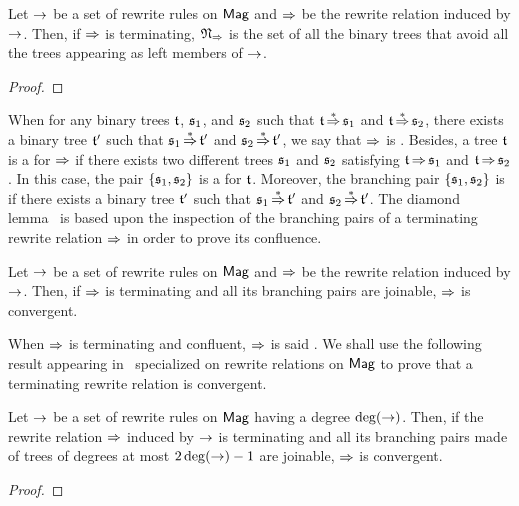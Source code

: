 \begin{Lemma} \label{lem:normal_forms_avoiding}
    Let $\operatorname{\to}$ be a set of rewrite rules on $\mathsf{Mag}$ and $\operatorname{\Rightarrow}$ be
    the rewrite relation induced by $\operatorname{\to}$. Then, if $\operatorname{\Rightarrow}$ is
    terminating, $\mathfrak{N}_{\operatorname{\Rightarrow}}$ is the set of all the
    binary trees that avoid all the trees appearing as left members
    of $\operatorname{\to}$.
\end{Lemma}
\begin{proof}
\end{proof}
\medbreak

When for any binary trees $\mathfrak{t}$, $\mathfrak{s}_1$, and $\mathfrak{s}_2$ such that
$\mathfrak{t} \operatorname{\overset{\ast}{\operatorname{\Rightarrow}}} \mathfrak{s}_1$ and $\mathfrak{t} \operatorname{\overset{\ast}{\operatorname{\Rightarrow}}} \mathfrak{s}_2$, there
exists a binary tree $\mathfrak{t}'$ such that $\mathfrak{s}_1 \operatorname{\overset{\ast}{\operatorname{\Rightarrow}}} \mathfrak{t}'$ and
$\mathfrak{s}_2 \operatorname{\overset{\ast}{\operatorname{\Rightarrow}}} \mathfrak{t}'$, we say that $\operatorname{\Rightarrow}$ is
. Besides, a tree $\mathfrak{t}$ is a  for
$\operatorname{\Rightarrow}$ if there exists two different trees $\mathfrak{s}_1$ and $\mathfrak{s}_2$
satisfying $\mathfrak{t} \operatorname{\Rightarrow} \mathfrak{s}_1$ and $\mathfrak{t} \operatorname{\Rightarrow} \mathfrak{s}_2$. In
this case, the pair $\{\mathfrak{s}_1, \mathfrak{s}_2\}$ is a  for
$\mathfrak{t}$. Moreover, the branching pair $\{\mathfrak{s}_1, \mathfrak{s}_2\}$ is
 if there exists a binary tree $\mathfrak{t}'$ such that
$\mathfrak{s}_1 \operatorname{\overset{\ast}{\operatorname{\Rightarrow}}} \mathfrak{t}'$ and $\mathfrak{s}_2 \operatorname{\overset{\ast}{\operatorname{\Rightarrow}}} \mathfrak{t}'$. The
diamond lemma~\cite{New42} is based upon the inspection of the branching
pairs of a terminating rewrite relation $\operatorname{\Rightarrow}$ in order to prove
its confluence.
\medbreak

\begin{Lemma} \label{lem:diamond_lemma}
    Let $\operatorname{\to}$ be a set of rewrite rules on $\mathsf{Mag}$ and $\operatorname{\Rightarrow}$ be
    the rewrite relation induced by $\operatorname{\to}$. Then, if $\operatorname{\Rightarrow}$ is
    terminating and all its branching pairs are joinable, $\operatorname{\Rightarrow}$
    is convergent.
\end{Lemma}
\medbreak

When $\operatorname{\Rightarrow}$ is terminating and confluent, $\operatorname{\Rightarrow}$ is said
. We shall use the following result appearing
in~\cite{Gir16} specialized on rewrite relations on $\mathsf{Mag}$ to prove that
a terminating rewrite relation is convergent.
\medbreak

\begin{Lemma} \label{lem:degree_confluence}
    Let $\operatorname{\to}$ be a set of rewrite rules on $\mathsf{Mag}$ having a degree
    $\mathrm{deg}(\operatorname{\to})$. Then, if the rewrite relation $\operatorname{\Rightarrow}$ induced by
    $\operatorname{\to}$ is terminating and all its branching pairs made of trees of
    degrees at most $2 \, \mathrm{deg}(\operatorname{\to}) - 1$ are joinable, $\operatorname{\Rightarrow}$ is
    convergent.
\end{Lemma}
\begin{proof}
\end{proof}
\medbreak

